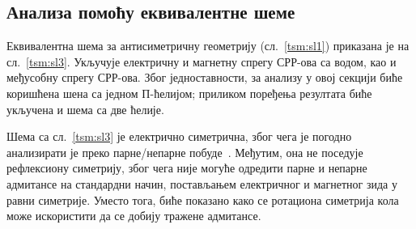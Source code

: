 \documentclass[main.tex]{subfiles}
\begin{document}
\subsection{Анализа помоћу еквивалентне шеме}\label{tsm:sec:eqcirc}
Еквивалентна шема за антисиметричну геометрију (сл.~\ref{tsm:sl1}) приказана је на сл.~\ref{tsm:sl3}. Укључује електричну и магнетну спрегу СРР-ова са водом, као и међусобну спрегу СРР-ова. Због једноставности, за анализу у овој секцији биће коришћена шена са једном П-ћелијом; приликом поређења резултата биће укључена и шема са две ћелије.

Шема са сл.~\ref{tsm:sl3} је електрично симетрична, због чега је погодно анализирати је преко парне/непарне побуде~\cite{hong}. Међутим, она не поседује рефлексиону симетрију, због чега није могуће одредити парне и непарне адмитансе на стандардни начин, постављањем електричног и магнетног зида у равни симетрије. Уместо тога, биће показано како се ротациона симетрија кола може искористити да се добију тражене адмитансе.
\end{document}
